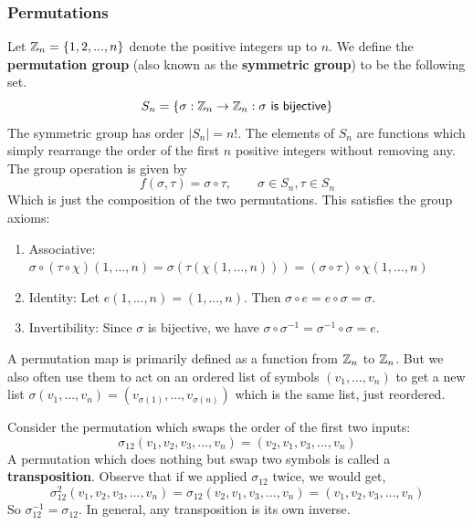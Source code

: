 \subsubsection{Permutations}
\begin{example}
Let $\operatorname{\mathbb{Z}}_n = \{1,2,...,n\}$ denote the positive integers up to $n$. We define the \textbf{permutation group} (also known as the \textbf{symmetric group}) to be the following set.
\begin{equation}
    S_n = \{\sigma : \operatorname{\mathbb{Z}}_n \to \operatorname{\mathbb{Z}}_n : \sigma \textsf{ is bijective}\}
\end{equation}
The symmetric group has order $|S_n| = n!$.
The elements of $S_n$ are functions which simply rearrange the order of the first $n$ positive integers without removing any. The group operation is given by
\[f(\sigma,\tau) = \sigma\circ\tau,\qquad \sigma\in S_n,\tau\in S_n\]
Which is just the composition of the two permutations. This satisfies the group axioms:
\begin{enumerate}
\item {
Associative: $\sigma\circ(\tau\circ \chi)(1,...,n) = \sigma(\tau(\chi(1,...,n))) = (\sigma\circ\tau)\circ\chi(1,...,n)$
}
\item {
Identity: Let $e(1,...,n) = (1,...,n)$. Then $\sigma \circ e = e\circ \sigma = \sigma$.
}
\item {
Invertibility: Since $\sigma$ is bijective, we have $\sigma \circ \sigma^{-1} = \sigma^{-1}\circ\sigma = e$.
}
\end{enumerate}
A permutation map is primarily defined as a function from $\operatorname{\mathbb{Z}}_n$ to $\operatorname{\mathbb{Z}}_n$. But we also often use them to act on an ordered list of symbols $(v_1,...,v_n)$ to get a new list $\sigma(v_1,...,v_n) =(v_{\sigma(1)},...,v_{\sigma(n)})$ which is the same list, just reordered.
\end{example}
\begin{example}[Transposition]
Consider the permutation which swaps the order of the first two inputs:
\[\sigma_{12}(v_1,v_2,v_3,...,v_n) = (v_2,v_1,v_3,...,v_n)\]
A permutation which does nothing but swap two symbols is called a \textbf{transposition}. Observe that if we applied $\sigma_{12}$ twice, we would get,
\[\sigma_{12}^2(v_1,v_2,v_3,...,v_n) = \sigma_{12}(v_2,v_1,v_3,...,v_n) = (v_1,v_2,v_3,...,v_n)\]
So $\sigma_{12}^{-1} = \sigma_{12}$. In general, any transposition is its own inverse.
\end{example}
